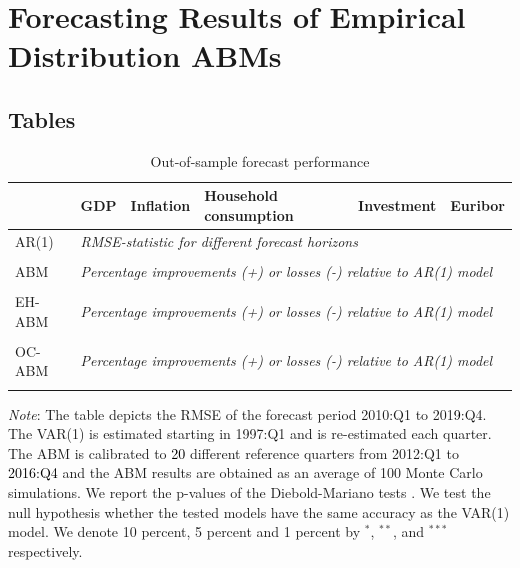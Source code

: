 \section{Forecasting Results of Empirical Distribution ABMs}
\subsection{Tables}
\begin{table}[!h]
	\caption{Out-of-sample forecast performance} 
	\label{table:rmse_ed_abm}
	\centering
    
		\begin{tabular}{llllll}
			\toprule
			& GDP & Inflation & Household consumption & Investment & Euribor \\
			\midrule
			AR(1) & \multicolumn{5}{l}{\textit{RMSE-statistic for different forecast horizons}} \\  \midrule
			 
               \\ \midrule
   			ABM & \multicolumn{5}{l}{\textit{Percentage improvements (+) or losses (-) relative to AR(1) model}} \\  \midrule
			
               \\ \midrule
            EH-ABM & \multicolumn{5}{l}{\textit{Percentage improvements (+) or losses (-) relative to AR(1) model}} \\  \midrule
			
               \\ \midrule

			OC-ABM & \multicolumn{5}{l}{\textit{Percentage improvements (+) or losses (-) relative to AR(1) model}} \\  \midrule
			
			\\ \bottomrule
		\end{tabular}
	\begin{tablenotes}
		\footnotesize \item \textit{Note}: The table depicts the RMSE of the forecast period 2010:Q1 to 201\textcolor{black}{9}:Q4. The VAR(1) is estimated starting in 1997:Q1 and is re-estimated each quarter. The ABM is calibrated to \textcolor{black}{20} different reference quarters from 2012:Q1 to \textcolor{black}{2016:Q4} and the ABM results are obtained as an average of 100 Monte Carlo simulations. We report the p-values of the Diebold-Mariano tests \citep{harveyTestingEqualityPrediction1997}.  We test the null hypothesis whether the tested models have the same accuracy as the VAR(1) model. We denote  10 percent, 5 percent and 1 percent by $^{*}$, $^{**}$, and $^{***}$ respectively.
	\end{tablenotes}
\end{table}



